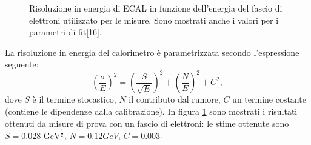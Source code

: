 \begin{figure}%
\centering
\caption{Risoluzione in energia di ECAL in funzione dell'energia del fascio di elettroni utilizzato per le misure. Sono mostrati anche i valori per i parametri di fit[16].}
\label{fig:risoluzione_ECAL}
\end{figure}

\noindent La risoluzione in energia del calorimetro \`e parametrizzata secondo l'espressione seguente:
\begin{equation}
{\left( \frac{\sigma}{E} \right)}^2 = {\left( \frac{S}{\sqrt{E}} \right)}^2 + {\left( \frac{N}{E} \right)}^2 + C^2,
\end{equation}
dove $S$ \`e il termine stocastico, $N$ il contributo dal rumore, $C$ un termine costante (contiene le dipendenze dalla calibrazione). In figura \ref{fig:risoluzione_ECAL} sono mostrati i risultati ottenuti da misure di prova con un fascio di elettroni: le stime ottenute sono $S=0.028 \mbox{ GeV}^{\frac{1}{2}}$, $N=0.12 GeV$, $C=0.003$.

